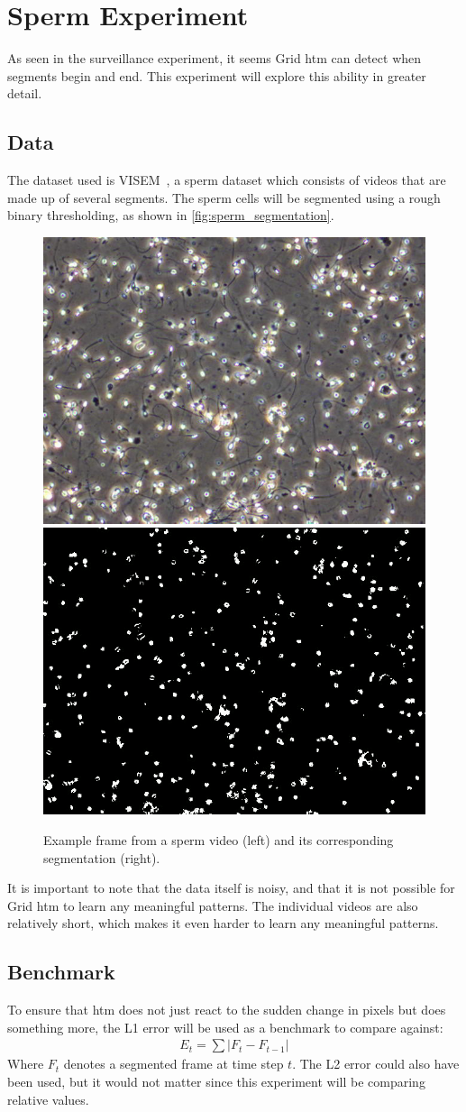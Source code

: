 \section{Sperm Experiment}
As seen in the surveillance experiment, it seems Grid \gls*{htm} can detect when segments begin and end. This experiment will explore this ability in greater detail.
\subsection{Data}
The dataset used is VISEM~\cite{VISEM}, a sperm dataset which consists of videos that are made up of several segments. The sperm cells will be segmented using a rough binary thresholding, as shown in \autoref{fig:sperm_segmentation}.
\begin{figure}[H]
    \centering
    \includegraphics[width=.45\textwidth]{resources/experiments/sperm/sperm_example.png}
    \includegraphics[width=.45\textwidth]{resources/experiments/sperm/sperm_seg_example.png}
    \caption[Sperm Example Frame]{Example frame from a sperm video (left) and its corresponding segmentation (right).}
    \label{fig:sperm_segmentation}
\end{figure}
It is important to note that the data itself is noisy, and that it is not possible for Grid \gls*{htm} to learn any meaningful patterns. The individual videos are also relatively short, which makes it even harder to learn any meaningful patterns.
\subsection{Benchmark}
To ensure that \gls*{htm} does not just react to the sudden change in pixels but does something more, the L1 error will be used as a benchmark to compare against:
\begin{align*}
    E_t=\sum|F_t-F_{t-1}|
\end{align*}
Where $F_t$ denotes a segmented frame at time step $t$. The L2 error could also have been used, but it would not matter since this experiment will be comparing relative values.

